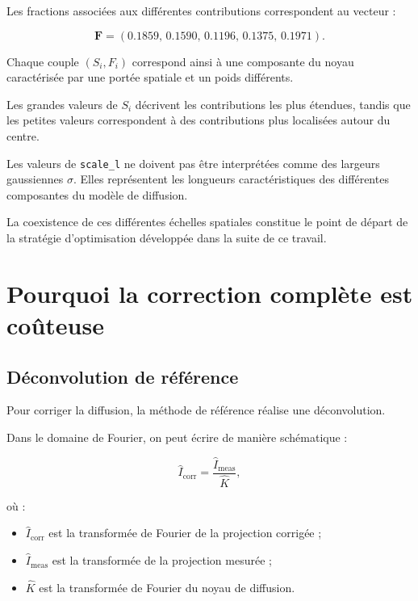 \documentclass[11pt,a4paper]{report}
\begin{document}
Les fractions associées aux différentes contributions correspondent au
vecteur :

\begin{equation}
\mathbf{F}
=
\left(
0.1859,\,
0.1590,\,
0.1196,\,
0.1375,\,
0.1971
\right).
\label{eq:fraction_parameters}
\end{equation}

Chaque couple $(S_i,F_i)$ correspond ainsi à une composante du noyau
caractérisée par une portée spatiale et un poids différents.

Les grandes valeurs de $S_i$ décrivent les contributions les plus
étendues, tandis que les petites valeurs correspondent à des contributions
plus localisées autour du centre.

Les valeurs de \texttt{scale\_l} ne doivent pas être interprétées comme des
largeurs gaussiennes $\sigma$. Elles représentent les longueurs
caractéristiques des différentes composantes du modèle de diffusion.

La coexistence de ces différentes échelles spatiales constitue le point
de départ de la stratégie d'optimisation développée dans la suite de ce
travail.


\chapter{Pourquoi la correction complète est coûteuse}

\section{Déconvolution de référence}

Pour corriger la diffusion, la méthode de référence réalise une
déconvolution.

Dans le domaine de Fourier, on peut écrire de manière schématique :

\begin{equation}
\widehat{I}_{\mathrm{corr}}
=
\frac{\widehat{I}_{\mathrm{meas}}}
{\widehat{K}},
\label{eq:deconv}
\end{equation}

où :

\begin{itemize}

    \item $\widehat{I}_{\mathrm{corr}}$ est la transformée de Fourier de la
    projection corrigée ;

    \item $\widehat{I}_{\mathrm{meas}}$ est la transformée de la projection
    mesurée ;

    \item $\widehat{K}$ est la transformée de Fourier du noyau de diffusion.

\end{itemize}
\end{document}
